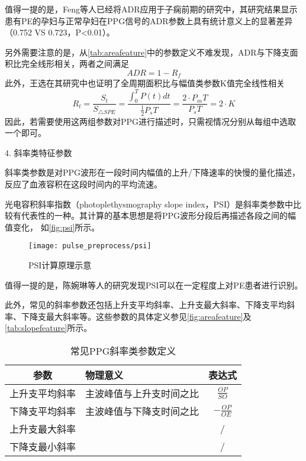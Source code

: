 值得一提的是，Feng等人已经将ADR应用于子痫前期的研究中，其研究结果显示患有PE的孕妇与正常孕妇在PPG信号的ADR参数上具有统计意义上的显著差异（0.752 VS 0.723，P<0.01）\cite{Feng2018}。

另外需要注意的是，从\autoref{tab:areafeature}中的参数定义不难发现，ADR与下降支面积比完全线形相关，两者之间满足
\begin{equation}
    \label{equ:adr}
    ADR = 1-R_f
\end{equation}
此外，王选在其研究中也证明了全周期面积比与幅值类参数K值完全线性相关\cite{Wang2012}
\begin{equation}
    \label{equ:kandart}
    R_t=\frac{S_t}{S_{\triangle SPE}}=\frac{\int_{0}^{T}P(t)dt}{\frac{1}{2}P_sT}=\frac{2\cdot P_mT}{P_sT}=2\cdot K
\end{equation}
因此，若需要使用这两组参数对PPG进行描述时，只需视情况分别从每组中选取一个即可。

4. 斜率类特征参数

斜率类参数是对PPG波形在一段时间内幅值的上升/下降速率的快慢的量化描述，反应了血液容积在这段时间内的平均流速。

光电容积斜率指数（photoplethysmography slope index，PSI）是斜率类参数中比较有代表性的一种\cite{Chen2019}。其计算的基本思想是将PPG波形分段后再描述各段之间的幅值变化，
如\autoref{fig:psi}所示。
\begin{figure}[htbp]
    \centering
    \texttt{[image: pulse\_preprocess/psi]}
    \caption[PSI计算原理示意]{\label{fig:psi}PSI计算原理示意\cite{Chen2019}}
\end{figure}
值得一提的是，陈婉琳等人的研究发现PSI可以在一定程度上对PE患者进行识别\cite{Chen2019}。

此外，常见的斜率参数还包括上升支平均斜率、上升支最大斜率、下降支平均斜率、下降支最大斜率等。这些参数的具体定义参见\autoref{fig:areafeature}及\autoref{tab:slopefeature}所示。
\begin{table}[htbp]
    \centering
    \caption{\label{tab:slopefeature}常见PPG斜率类参数定义}
    \begin{tabularx}{\linewidth}{cX<{\centering}c}
    \toprule
    \textbf{参数} & \textbf{物理意义} & \textbf{表达式} \\
    \midrule
    上升支平均斜率      &  主波峰值与上升支时间之比         &  $\frac{OP}{SO}$\\
    下降支平均斜率      &  主波峰值与下降支时间之比         &  $-\frac{OP}{OE}$\\
    上升支最大斜率      &           &  /\\
    下降支最小斜率      &           &   /    \\
    \bottomrule
    \end{tabularx}
\end{table}

